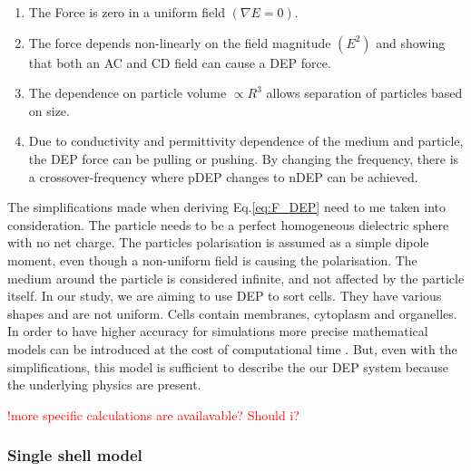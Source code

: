 \documentclass[final]{jyflluk}
\begin{document}
\begin{enumerate}
\renewcommand{\labelenumi}{\roman{enumi}}  %
    \item The Force is zero in a uniform field $(\nabla E=0)$.
    \item The force depends non-linearly on the field magnitude $(E^2)$ and showing that both an AC and CD field can cause a DEP force.
    \item The dependence on particle volume $\propto R^3$ allows separation of particles based on size.
    \item Due to conductivity and permittivity dependence of the medium and particle, the DEP force can be pulling or  pushing. By changing the frequency, there is a crossover-frequency where pDEP changes to nDEP can be achieved. \cite{zhang_dielectrophoresis_2010}
\end{enumerate}
The simplifications made when deriving Eq.\ref{eq:F_DEP} need to me taken into consideration. The particle needs to be a perfect homogeneous dielectric sphere with no net charge. The particles polarisation is assumed as a simple dipole moment, even though a non-uniform field is causing the polarisation.  The medium around the particle is considered infinite, and not affected by the particle itself. \cite{pethig_review_2010}
In our study, we are aiming to use DEP to sort cells. They have various shapes and are not uniform. Cells contain membranes, cytoplasm and organelles. In order to have higher accuracy for simulations more precise mathematical models can be introduced at the cost of computational time \cite{jubery_dielectrophoretic_2014, cetin_dielectrophoresis_2011, pethig_review_2010, cottet_mydep_2019}. But, even with the simplifications, this model is sufficient to describe the our DEP system because the underlying physics are present.

\textcolor{red}{!more specific calculations are availavable? Should i?}
\subsubsection{Single shell model}
\label{sec:x3.2}
\end{document}
